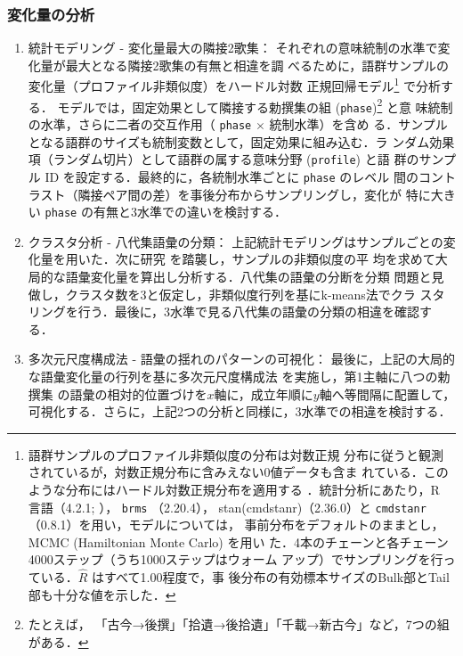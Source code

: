 \documentclass[submit]{ipsj}
\begin{document}
\subsubsection{変化量の分析\label{orga323d74}}
\label{sec:orgd0edf8e}
\begin{enumerate}
\item 統計モデリング - 変化量最大の隣接2歌集：\label{org37ea4d5}
\label{sec:orgc092f74}
それぞれの意味統制の水準で変化量が最大となる隣接2歌集の有無と相違を調
べるために，語群サンプルの変化量（プロファイル非類似度）をハードル対数
正規回帰モデル\footnote{語群サンプルのプロファイル非類似度の分布は対数正規
分布に従うと観測されているが，対数正規分布に含みえない0値データも含ま
れている．このような分布にはハードル対数正規分布を適用する
\cite{Chaudhry2018NGO}．統計分析にあたり，R 言語（4.2.1;
\cite{RCoreTeam2022Language}）， \texttt{brms} （2.20.4），
stan(cmdstanr)（2.36.0）と \texttt{cmdstanr} （0.8.1）を用い，モデルについては，
事前分布をデフォルトのままとし，MCMC (Hamiltonian Monte Carlo) を用い
た．4本のチェーンと各チェーン4000ステップ（うち1000ステップはウォーム
アップ）でサンプリングを行っている．\(\hat{R}\) はすべて1.00程度で，事
後分布の有効標本サイズのBulk部とTail部も十分な値を示した．} で分析する．
モデルでは，固定効果として隣接する勅撰集の組 (\texttt{phase})\footnote{たとえば，
「古今→後撰」「拾遺→後拾遺」「千載→新古今」など，7つの組がある．} と意
味統制の水準，さらに二者の交互作用（ \texttt{phase} \(\times\) 統制水準）を含め
る．サンプルとなる語群のサイズも統制変数として，固定効果に組み込む．ラ
ンダム効果項（ランダム切片）として語群の属する意味分野 (\texttt{profile}) と語
群のサンプル ID を設定する．最終的に，各統制水準ごとに \texttt{phase} のレベル
間のコントラスト（隣接ペア間の差）を事後分布からサンプリングし，変化が
特に大きい \texttt{phase} の有無と3水準での違いを検討する．
\item クラスタ分析 - 八代集語彙の分類：\label{orgc0c106b}
\label{sec:org94d59fa}
上記統計モデリングはサンプルごとの変化量を用いた．次に研究
\cite{Speelman2003Profilebased} を踏襲し，サンプルの非類似度の平
均を求めて大局的な語彙変化量を算出し分析する．八代集の語彙の分断を分類
問題と見做し，クラスタ数を3と仮定し，非類似度行列を基にk-means法でクラ
スタリングを行う．最後に，3水準で見る八代集の語彙の分類の相違を確認す
る．
\item 多次元尺度構成法 - 語彙の揺れのパターンの可視化：\label{org632a34b}
\label{sec:org0109f29}
最後に，上記の大局的な語彙変化量の行列を基に多次元尺度構成法
\cite{Kruskal1964Multidimensional} を実施し，第1主軸に八つの勅撰集
の語彙の相対的位置づけを\(x\)軸に，成立年順に\(y\)軸へ等間隔に配置して，
可視化する．さらに，上記2つの分析と同様に，3水準での相違を検討する．
\end{enumerate}
\end{document}
